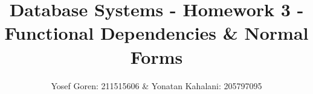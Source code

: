 \documentclass{article}
\begin{document}
\author{Yosef Goren: 211515606 \& Yonatan Kahalani: 205797095}
\title{Database Systems - Homework 3 - Functional Dependencies \& Normal Forms}
\maketitle

\tableofcontents






\end{document}
